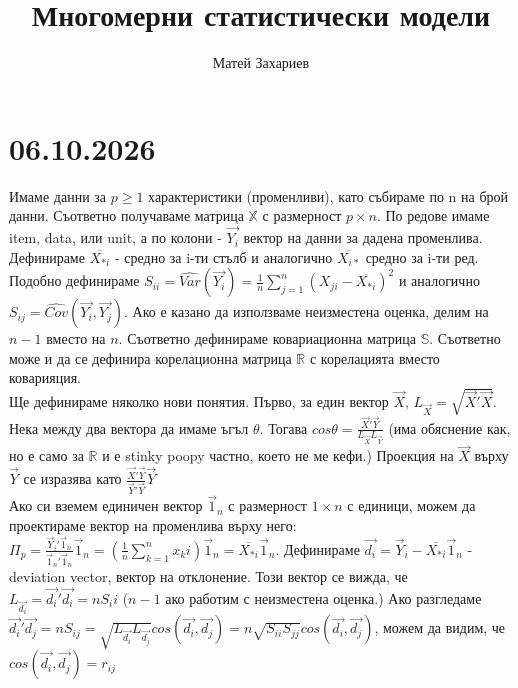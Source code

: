 \documentclass[12pt, a4paper]{article}
\title{Многомерни статистически модели}
\author{Матей Захариев}
\date{}
\def\D{\mathbb}
\begin{document}
\maketitle

\section*{06.10.2026}
Имаме данни за $p\geq1$ характеристики (променливи), като събираме по n на брой данни. Съответно получаваме матрица $\D{X}$ с  размерност $p\times n$. По редове имаме item, data, или unit, а по колони - $\vec{Y_i}$ вектор на данни за дадена променлива. Дефинираме $\overline{X_{*i}}$ - средно за i-ти стълб и аналогично $\overline{X_{i*}}$ средно за i-ти ред. Подобно дефинираме $S_{ii} = \hat{Var}(\vec{Y_i})=\frac{1}{n}\sum_{j=1}^{n}(X_{ji}-\overline{X_{*i}})^2$ и аналогично $S_{ij}=\hat{Cov}(\vec{Y_i}, \vec{Y_j})$. Ако е казано да използваме неизместена оценка, делим на $n-1$ вместо на $n$. Съответно дефинираме ковариационна матрица $\D{S}$. Съответно може и да се дефинира корелационна матрица $\D{R}$ с корелацията вместо коварияция.\\
Ще дефинираме няколко нови понятия. Първо, за един вектор $\vec{X}$, $L_{\vec{X}}=\sqrt{\vec{X}'\vec{X}}$. Нека между два вектора да имаме ъгъл $\theta$. Тогава $cos\theta=\frac{\vec{X}'\vec{Y}}{L_{\vec{X}}L_{\vec{Y}}}$ (има обяснение как, но е само за $\D{R}$ и е stinky poopy частно, което не ме кефи.) Проекция на $\vec{X}$ върху $\vec{Y}$ се изразява като $\frac{\vec{X}'\vec{Y}}{\vec{Y}'\vec{Y}}\vec{Y}$\\
Ако си вземем единичен вектор $\vec{1}_n$ с размерност $1\times n$ с единици, можем да проектираме вектор на променлива върху него: $\Pi_p=\frac{\vec{Y}_i'\vec{1}_n}{\vec{1}_n'\vec{1}_n}\vec{1}_n=\left(\frac{1}{n}\sum_{k=1}^{n}x_ki\right)\vec{1}_n=\overline{X_{*i}}\vec{1}_n$. Дефинираме $\vec{d_i}=\vec{Y}_i-\overline{X_{*i}}\vec{1}_n$ - deviation vector, вектор на отклонение. Този вектор се вижда, че $L_{\vec{d_i}}=\vec{d_i}'\vec{d_i}=nS_ii$ ($n-1$ ако работим с неизместена оценка.) Ако разгледаме $ \vec{d_i}'\vec{d_j} = nS_{ij}=\sqrt{L_{\vec{d_i}}L_{\vec{d_j}}}cos(\vec{d_i},\vec{d_j})=n\sqrt{S_{ii}S_{jj}}cos(\vec{d_i},\vec{d_j})$, можем да видим, че $cos(\vec{d_i},\vec{d_j})=r_{ij}$
\end{document}
